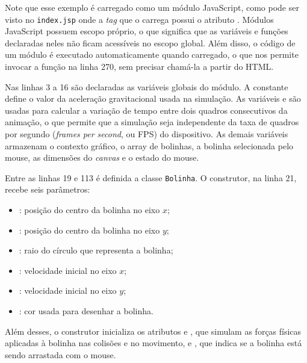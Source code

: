 
Note que esse exemplo é carregado como um módulo JavaScript, como pode ser visto no \texttt{index.jsp} onde a \textit{tag}  que o carrega possui o atributo . Módulos JavaScript possuem escopo próprio, o que significa que as variáveis e funções declaradas neles não ficam acessíveis no escopo global. Além disso, o código de um módulo é executado automaticamente quando carregado, o que nos permite invocar a função  na linha 270, sem precisar chamá-la a partir do HTML.

Nas linhas 3 a 16 são declaradas as variáveis globais do módulo. A constante  define o valor da aceleração gravitacional usada na simulação. As variáveis  e  são usadas para calcular a variação de tempo entre dois quadros consecutivos da animação, o que permite que a simulação seja independente da taxa de quadros por segundo (\textit{frames per second}, ou FPS) do dispositivo. As demais variáveis armazenam o contexto gráfico, o array de bolinhas, a bolinha selecionada pelo mouse, as dimensões do \textit{canvas} e o estado do mouse.

Entre as linhas 19 e 113 é definida a classe \texttt{Bolinha}. O construtor, na linha 21, recebe seis parâmetros:

\begin{itemize}
    \item {}: posição do centro da bolinha no eixo $x$;
    \item {}: posição do centro da bolinha no eixo $y$;
    \item {}: raio do círculo que representa a bolinha;
    \item {}: velocidade inicial no eixo $x$;
    \item {}: velocidade inicial no eixo $y$;
    \item {}: cor usada para desenhar a bolinha.
\end{itemize}

Além desses, o construtor inicializa os atributos  e , que simulam as forças físicas aplicadas à bolinha nas colisões e no movimento, e , que indica se a bolinha está sendo arrastada com o mouse.

